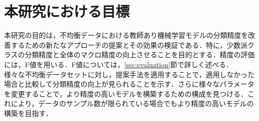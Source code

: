 \section{本研究における目標}

本研究の目的は，不均衡データにおける教師あり機械学習モデルの分類精度を改善するための新たなアプローチの提案とその効果の検証である．特に，少数派クラスの分類精度と全体のマクロ精度の向上させることを目的とする．精度の評価には，F値を用いる．F値については，\ref{sec:evaluation}節で詳しく述べる．\\
様々な不均衡データセットに対し，提案手法を適用することで，適用しなかった場合と比較して分類精度の向上が見られることを示す．さらに様々なパラメータを変更することで，より精度の高いモデルを構築するための構成を見つける．これにより，データのサンプル数が限られている場合でもより精度の高いモデルの構築を目指す．\\
